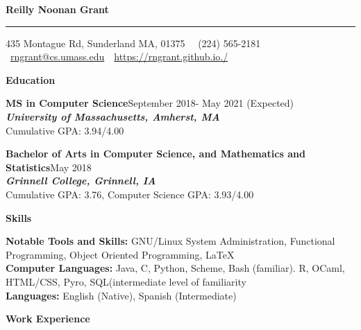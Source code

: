\documentclass[9pt]{extarticle}
\begin{document}
\sffamily
\begin{huge}
\begin{center}
\textbf{Reilly Noonan Grant}
\end{center}
\end{huge}
\rule{19cm}{0.4pt}
\begin{center}
  435 Montague Rd, Sunderland MA, 01375 \,
\textbullet\, (224) 565-2181 \textbullet\ \href{mailto:rngrant@cs.umass.edu}{rngrant@cs.umass.edu} \,\textbullet\, \href{https://rngrant.github.io./}{https://rngrant.github.io./}
\end{center}

\begin{large}
\begin{center}\textbf{Education}
\end{center}
\end{large}

\textbf{MS in Computer Science}\hfill September 2018- May 2021 (Expected)\\
\textbf{\textit{University of Massachusetts, Amherst, MA}}\\
Cumulative GPA: 3.94/4.00

\textbf{Bachelor of Arts in Computer Science, and Mathematics and Statistics}\hfill May 2018\\
\textbf{\textit{Grinnell College, Grinnell, IA}}\\
Cumulative GPA: 3.76, Computer Science GPA: 3.93/4.00  \\

\begin{large}
\begin{center}\textbf{Skills}
\end{center}
\end{large}
\textbf{Notable Tools and Skills:} GNU/Linux System Administration,
Functional Programming, Object Oriented Programming, \LaTeX  \\
\textbf{Computer Languages: }Java, C, Python, Scheme, Bash
(familiar). R, OCaml, HTML/CSS, Pyro, SQL(intermediate level of familiarity\\
\textbf{Languages:} English (Native), Spanish (Intermediate)


\begin{large}
\begin{center}\textbf{Work Experience}
\end{center}
\end{large}
\end{document}
